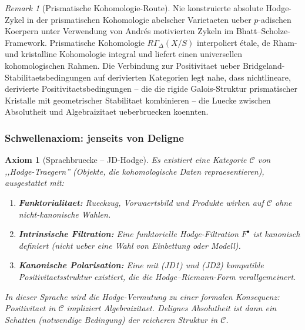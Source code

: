 \documentclass[aps,prd,twocolumn,superscriptaddress,nofootinbib]{revtex4-2}
\newtheorem{axiom}[theorem]{Axiom}
\theoremstyle{definition}
\theoremstyle{remark}
\newtheorem{remark}[theorem]{Remark}
\begin{document}
\begin{remark}[Prismatische Kohomologie-Route]\label{rem:prismatic-route}
Nie \cite{Nie2021} konstruierte absolute Hodge-Zykel in der prismatischen Kohomologie abelscher Varietaeten ueber $p$-adischen Koerpern unter Verwendung von Andr\'es motivierten Zykeln im Bhatt--Scholze-Framework. Prismatische Kohomologie $R\Gamma_\Delta(X/S)$ interpoliert \'etale, de Rham- und kristalline Kohomologie integral und liefert einen universellen kohomologischen Rahmen. Die Verbindung zur Positivitaet ueber Bridgeland-Stabilitaetsbedingungen auf derivierten Kategorien legt nahe, dass nichtlineare, derivierte Positivitaetsbedingungen -- die die rigide Galois-Struktur prismatischer Kristalle mit geometrischer Stabilitaet kombinieren -- die Luecke zwischen Absolutheit und Algebraizitaet ueberbruecken koennten.
\end{remark}

\subsubsection*{Schwellenaxiom: jenseits von Deligne}

\begin{axiom}[Sprachbruecke -- JD-Hodge]\label{ax:jd-hodge}
Es existiert eine Kategorie $\mathcal{C}$ von ,,Hodge-Traegern'' (Objekte, die kohomologische Daten repraesentieren), ausgestattet mit:
\begin{enumerate}
\item[(JD1)] \textbf{Funktorialitaet:} Rueckzug, Vorwaertsbild und Produkte wirken auf $\mathcal{C}$ ohne nicht-kanonische Wahlen.
\item[(JD2)] \textbf{Intrinsische Filtration:} Eine funktorielle Hodge-Filtration $F^\bullet$ ist kanonisch definiert (nicht ueber eine Wahl von Einbettung oder Modell).
\item[(JD3)] \textbf{Kanonische Polarisation:} Eine mit (JD1) und (JD2) kompatible Positivitaetsstruktur existiert, die die Hodge--Riemann-Form verallgemeinert.
\end{enumerate}
In dieser Sprache wird die Hodge-Vermutung zu einer \emph{formalen Konsequenz}: Positivitaet in $\mathcal{C}$ impliziert Algebraizitaet. Delignes Absolutheit ist dann ein Schatten (notwendige Bedingung) der reicheren Struktur in $\mathcal{C}$.
\end{axiom}
\end{document}
